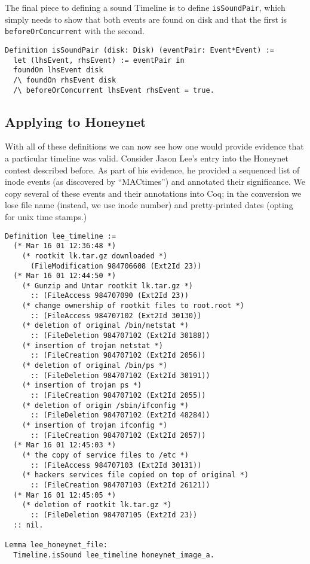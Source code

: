 \documentclass[nocopyrightspace]{sigplanconf}
\begin{document}
The final piece to defining a sound Timeline is to define {\tt isSoundPair},
which simply needs to show that both events are found on disk and that the
first is {\tt beforeOrConcurrent} with the second. 

\begin{lstlisting}
Definition isSoundPair (disk: Disk) (eventPair: Event*Event) :=
  let (lhsEvent, rhsEvent) := eventPair in
  foundOn lhsEvent disk
  /\ foundOn rhsEvent disk
  /\ beforeOrConcurrent lhsEvent rhsEvent = true.
\end{lstlisting}


\subsection{Applying to Honeynet}
With all of these definitions we can now see how one would provide evidence
that a particular timeline was valid. Consider Jason Lee's entry\cite{lee}
into the Honeynet contest described before. As part of his evidence, he
provided a sequenced list of inode events (as discovered by ``MACtimes'') and
annotated their significance. We copy several of these events and their
annotations into Coq; in the conversion we lose file name (instead, we use
inode number) and pretty-printed dates (opting for unix time stamps.)

\begin{lstlisting}
Definition lee_timeline :=
  (* Mar 16 01 12:36:48 *)
    (* rootkit lk.tar.gz downloaded *)
      (FileModification 984706608 (Ext2Id 23))
  (* Mar 16 01 12:44:50 *)
    (* Gunzip and Untar rootkit lk.tar.gz *)
      :: (FileAccess 984707090 (Ext2Id 23))
    (* change ownership of rootkit files to root.root *)
      :: (FileAccess 984707102 (Ext2Id 30130))
    (* deletion of original /bin/netstat *)
      :: (FileDeletion 984707102 (Ext2Id 30188))
    (* insertion of trojan netstat *)
      :: (FileCreation 984707102 (Ext2Id 2056))
    (* deletion of original /bin/ps *)
      :: (FileDeletion 984707102 (Ext2Id 30191))
    (* insertion of trojan ps *)
      :: (FileCreation 984707102 (Ext2Id 2055))
    (* deletion of origin /sbin/ifconfig *)
      :: (FileDeletion 984707102 (Ext2Id 48284))
    (* insertion of trojan ifconfig *)
      :: (FileCreation 984707102 (Ext2Id 2057))
  (* Mar 16 01 12:45:03 *)
    (* the copy of service files to /etc *)
      :: (FileAccess 984707103 (Ext2Id 30131))
    (* hackers services file copied on top of original *)
      :: (FileCreation 984707103 (Ext2Id 26121))
  (* Mar 16 01 12:45:05 *)
    (* deletion of rootkit lk.tar.gz *)
      :: (FileDeletion 984707105 (Ext2Id 23))
  :: nil.

Lemma lee_honeynet_file:
  Timeline.isSound lee_timeline honeynet_image_a.
\end{lstlisting}
\end{document}
